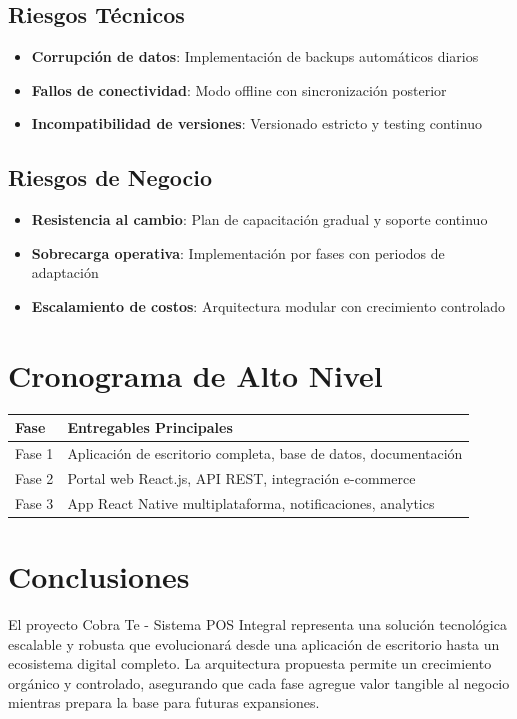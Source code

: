 \documentclass[12pt,letterpaper]{article}
\begin{document}
\subsection{Riesgos Técnicos}
\begin{itemize}
    \item \textbf{Corrupción de datos}: Implementación de backups automáticos diarios
    \item \textbf{Fallos de conectividad}: Modo offline con sincronización posterior
    \item \textbf{Incompatibilidad de versiones}: Versionado estricto y testing continuo
\end{itemize}

\subsection{Riesgos de Negocio}
\begin{itemize}
    \item \textbf{Resistencia al cambio}: Plan de capacitación gradual y soporte continuo
    \item \textbf{Sobrecarga operativa}: Implementación por fases con periodos de adaptación
    \item \textbf{Escalamiento de costos}: Arquitectura modular con crecimiento controlado
\end{itemize}

\section{Cronograma de Alto Nivel}

\begin{longtable}{|p{3cm}|p{12cm}|}
\hline
\rowcolor{cobrablue!20}
\textbf{Fase} & \textbf{Entregables Principales} \\
\hline
\endhead
Fase 1 & Aplicación de escritorio completa, base de datos, documentación \\
\hline
Fase 2 & Portal web React.js, API REST, integración e-commerce \\
\hline
Fase 3 & App React Native multiplataforma, notificaciones, analytics \\
\hline
\end{longtable}

\section{Conclusiones}

El proyecto Cobra Te - Sistema POS Integral representa una solución tecnológica escalable y robusta que evolucionará desde una aplicación de escritorio hasta un ecosistema digital completo. La arquitectura propuesta permite un crecimiento orgánico y controlado, asegurando que cada fase agregue valor tangible al negocio mientras prepara la base para futuras expansiones.
\end{document}

